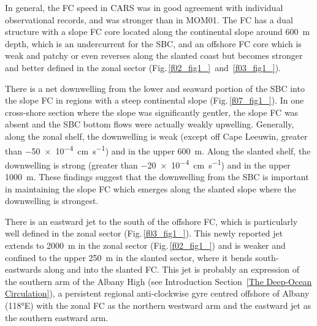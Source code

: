 \documentclass[preprint,3p,review,12pt]{elsarticle}
\begin{document}
In general, the FC speed in CARS was in good agreement with individual observational records, and was stronger than in MOM01.
The FC has a dual structure with a slope FC core located along the continental slope around \SI{600}{\meter} depth, which is an undercurrent for the SBC, and an offshore FC core 
which is weak and patchy or even reverses along the slanted coast but becomes stronger and better defined in the zonal sector (Fig.\,\ref{f02_fig1_}~and~\ref{f03_fig1_}).

There is a net downwelling
from the lower and seaward portion of the SBC into the slope FC
in regions with a steep continental slope (Fig.\,\ref{f07_fig1_}).
In one cross-shore section where the slope was significantly gentler, the slope FC was absent and the SBC bottom flows were actually weakly upwelling. Generally, along the zonal shelf, the downwelling is weak (except off Cape Leeuwin, greater than \SI{-50 e-4}{\centi\meter\per\second}) and in the upper \SI{600}{\meter}. Along the slanted shelf, the downwelling is strong (greater than \SI{-20 e-4}{\centi\meter\per\second}) and in the upper \SI{1000}{\meter}. These findings suggest that the downwelling from the SBC is important in maintaining the slope FC which emerges along the slanted slope where the downwelling is strongest.

There is an eastward jet to the south of the offshore FC, which is particularly well defined in the zonal sector (Fig.\,\ref{f03_fig1_}).
This newly reported jet extends
to \SI{2000}{\meter} in the zonal sector (Fig.\,\ref{f02_fig1_}) and is weaker and confined to the upper \SI{250}{\meter} in the slanted sector,
where it bends south-eastwards along and into the slanted FC\@.
This jet is probably an expression of the southern arm
of the Albany High (see Introduction Section~\ref{The Deep-Ocean Circulation}),
a persistent regional anti-clockwise gyre centred offshore of Albany (\ang{118}E) with the zonal FC as the northern westward arm and the eastward jet as the southern eastward arm.
\end{document}
